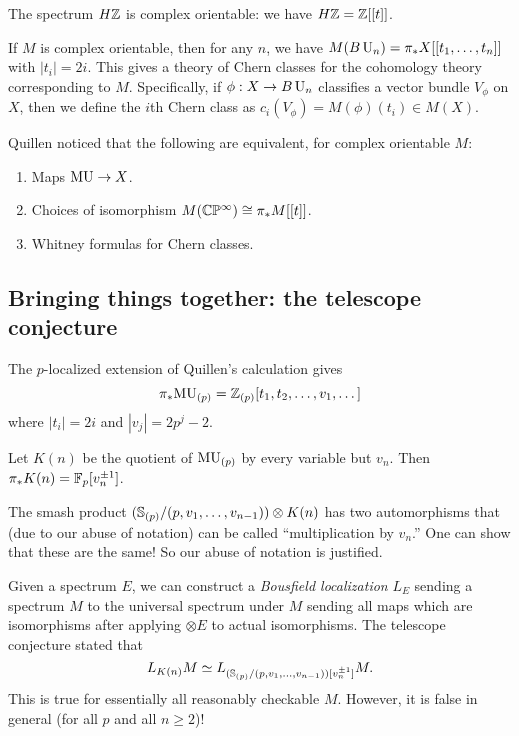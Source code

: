 \documentclass{article}
\begin{document}
\begin{ex}
	The spectrum $H\mathbb{Z}$ is complex orientable: we have $H\mathbb{Z} = \mathbb{Z}[[t]]$.
\end{ex}

If $M$ is complex orientable, then for any $n$, we have $M(B\operatorname{U}_n) = \pi_* X[[t_1, \dots, t_n]]$ with $|t_i| = 2i$.
This gives a theory of Chern classes for the cohomology theory corresponding to $M$.
Specifically, if $\phi: X \to B\operatorname{U}_n$ classifies a vector bundle $V_\phi$ on $X$, then we define the $i$th Chern class as $c_i(V_\phi) = M(\phi)(t_i) \in M(X)$.

Quillen noticed that the following are equivalent, for complex orientable $M$:
\begin{enumerate}
	\item Maps $\mathrm{MU} \to X$.
	\item Choices of isomorphism $M(\mathbb{C}\mathbb{P}^\infty) \cong \pi_* M [[t]]$.
	\item Whitney formulas for Chern classes.
\end{enumerate}

\subsection{Bringing things together: the telescope conjecture}

The $p$-localized extension of Quillen's calculation gives
\[
	\pi_* \mathrm{MU}_{(p)} = \mathbb{Z}_{(p)} [t_1, t_2, \dots, v_1, \dots]
\]
where $|t_i| = 2i$ and $|v_j| = 2p^j - 2$.

Let $K(n)$ be the quotient of $\mathrm{MU}_{(p)}$ by every variable but $v_n$.
Then $\pi_* K(n) = \mathbb{F}_p[v_n^{\pm 1}]$.

The smash product $(\mathbb{S}_{(p)} / (p, v_1, \dots, v_{n-1})) \otimes K(n)$ has two automorphisms that (due to our abuse of notation) can be called ``multiplication by $v_n$.''
One can show that these are the same!
So our abuse of notation is justified.

Given a spectrum $E$, we can construct a \emph{Bousfield localization} $L_E$ sending a spectrum $M$ to the universal spectrum under $M$ sending all maps which are isomorphisms after applying $\otimes E$ to actual isomorphisms.
The telescope conjecture stated that
\[
	L_{K(n)} M \simeq L_{(\mathbb{S}_{(p)} / (p, v_1, \dots, v_{n-1}))[v_n^{\pm 1}]} M.
\]
This is true for essentially all reasonably checkable $M$.
However, it is false in general (for all $p$ and all $n \geq 2$)!
\end{document}
